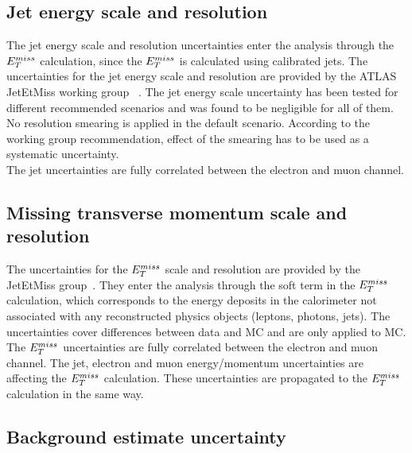 \subsection{Jet energy scale and resolution}
The jet energy scale and resolution uncertainties enter the analysis through 
the $E_T^{miss}$ calculation, since the $E_T^{miss}$ is calculated using calibrated jets. 
The uncertainties for the jet energy scale and resolution are provided 
by the ATLAS JetEtMiss working group ~\cite{jet_calib_syst_13TeV, JESUncer13TeV}. 
The jet energy scale uncertainty has been tested for different recommended scenarios 
and was found to be negligible for all of them.\\
No resolution smearing is applied in the default scenario. 
According to the working group recommendation, effect of the smearing has to be used as a systematic uncertainty.\\ The jet uncertainties are fully correlated between the electron and muon channel.

\subsection{Missing transverse momentum scale and resolution}
The uncertainties for the $E_T^{miss}$ scale and resolution are provided by the JetEtMiss group~\cite{met2015_1}. They enter
the analysis through the soft term in the $E_T^{miss}$ calculation, 
which corresponds to the energy deposits in the calorimeter not associated with
any reconstructed physics objects (leptons, photons, jets).
The uncertainties cover differences between data and MC and are only applied to MC. 
The $E_T^{miss}$ uncertainties are fully correlated between the electron and muon channel. 
The jet, electron and muon energy/momentum uncertainties are affecting the $E_T^{miss}$
calculation. These uncertainties are propagated to the $E_T^{miss}$ calculation in the same way.

\subsection{Background estimate uncertainty}

